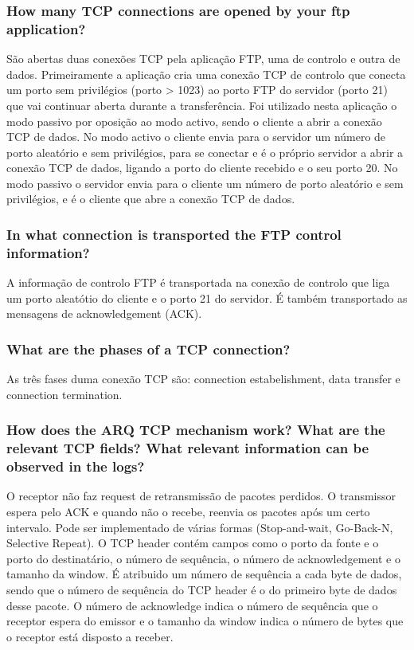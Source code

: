 \documentclass[a4paper]{article}
\begin{document}
\subsubsection{How many TCP connections are opened by your ftp application?}

São abertas duas conexões TCP pela aplicação FTP, uma de controlo e outra de dados.
Primeiramente a aplicação cria uma conexão TCP de controlo que conecta um porto sem privilégios (porto > 1023) ao porto FTP do servidor (porto 21) que vai continuar aberta durante a transferência.
Foi utilizado nesta aplicação o modo passivo por oposição ao modo activo, sendo o cliente a abrir a conexão TCP de dados.
No modo activo o cliente envia para o servidor um número de porto aleatório e sem privilégios, para se conectar e é o próprio servidor a abrir a conexão TCP de dados, ligando a porto do cliente recebido e o seu porto 20.
No modo passivo o servidor envia para o cliente um número de porto aleatório e sem privilégios, e é o cliente que abre a conexão TCP de dados.

\subsubsection{In what connection is transported the FTP control information?}

A informação de controlo FTP é transportada na conexão de controlo que liga um porto aleatótio do cliente e o porto 21 do servidor. É também transportado as mensagens de acknowledgement (ACK).

\subsubsection{What are the phases of a TCP connection?}

As três fases duma conexão TCP são: connection estabelishment, data transfer e connection termination.

\subsubsection{How does the ARQ TCP mechanism work? What are the relevant TCP
fields? What relevant information can be observed in the logs?}

O receptor não faz request de retransmissão de pacotes perdidos. O transmissor espera pelo ACK e quando
não o recebe, reenvia os pacotes após um certo intervalo. Pode ser implementado de várias formas (Stop-and-wait, Go-Back-N,
Selective Repeat).
O TCP header contém campos como o porto da fonte e o porto do destinatário, o número de sequência, o número de acknowledgement e
o tamanho da window.
É atribuido um número de sequência a cada byte de dados, sendo que o número de sequência do TCP header é o do primeiro byte de dados desse pacote. O número de acknowledge indica o número de sequência que o receptor espera do emissor e o tamanho da window indica o número de bytes que o receptor está disposto a receber.
\end{document}

